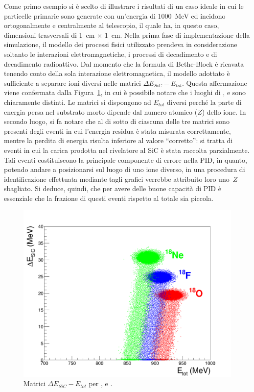 Come primo esempio si è scelto di illustrare i risultati di un caso ideale in cui le particelle primarie sono generate con un'energia di 1000~MeV ed incidono ortogonalmente e centralmente al telescopio, il quale ha, in questo caso, dimensioni trasversali di 1~cm $\times$ 1~cm.
Nella prima fase di implementazione della simulazione, il modello dei processi fisici utilizzato prendeva in considerazione soltanto le interazioni elettromagnetiche, i processi di decadimento e di decadimento radioattivo.
Dal momento che la formula di Bethe-Block è ricavata tenendo conto della sola interazione elettromagnetica, il modello adottato è sufficiente a separare ioni diversi nelle matrici $\Delta E_{SiC} - E_{tot}$.
Questa affermazione viene confermata dalla Figura~\ref{fig:deltaE_ETot}, in cui è possibile notare che i luoghi di ,  e  sono chiaramente distinti.
Le matrici si dispongono ad $E_{tot}$ diversi perché la parte di energia persa nel substrato morto dipende dal numero atomico ($Z$) dello ione.
In secondo luogo, si fa notare che al di sotto di ciascuna delle tre matrici sono presenti degli eventi in cui l'energia residua è stata misurata correttamente, mentre la perdita di energia risulta inferiore al valore ``corretto'': si tratta di eventi in cui la carica prodotta nel rivelatore al SiC è stata raccolta parzialmente. 
Tali eventi costituiscono la principale componente di errore nella PID, in quanto, potendo andare a posizionarsi sul luogo di uno ione diverso, in una procedura di identificazione effettuata mediante tagli grafici verrebbe attribuito loro uno~$Z$ sbagliato.
Si deduce, quindi, che per avere delle buone capacità di PID è essenziale che la frazione di questi eventi rispetto al totale sia piccola.



\begin{figure} [!t]
	\centering
	\includegraphics[width=\textwidth, keepaspectratio]{Grafici_Tesi/Particelle_monocromatiche/deltaE_ETot_punti_grandi.png}
	\caption{Matrici $\Delta E_{SiC} - E_{tot}$ per ,  e .} \label{fig:deltaE_ETot}
\end{figure}



